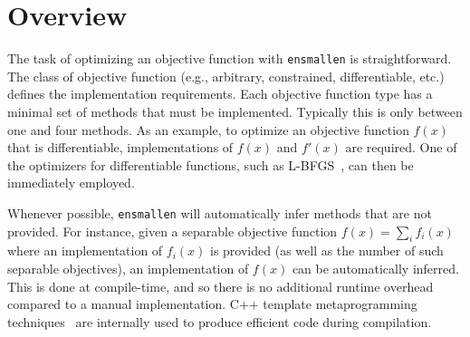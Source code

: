 \section{Overview}
\label{sec:overview}



% 

The task of optimizing an objective function with {\tt ensmallen} is
straightforward.  The class of objective function (e.g., arbitrary, constrained,
differentiable, etc.) defines the implementation requirements.
Each objective function type has a minimal set of methods that must be implemented.
Typically this is only between one and four methods.
As an example,
to optimize an objective function $f(x)$ that is differentiable,
implementations of $f(x)$ and $f'(x)$ are required.
One of the optimizers for differentiable functions,
such as L-BFGS~\cite{liu1989limited},
can then be immediately employed.

Whenever possible, {\tt ensmallen} will automatically infer methods that are
not provided.  For instance, given a separable objective function $f(x) = \sum_i
f_i(x)$ where an implementation of $f_i(x)$ is provided (as well as the number
of such separable objectives), an implementation of $f(x)$ can be automatically
inferred.  This is done at compile-time, and so there is no additional runtime
overhead compared to a manual implementation.  C++ template metaprogramming
techniques~\cite{abrahams2004c++,alexandrescu2001modern, veldhuizen1998c++} are
internally used to produce efficient code during compilation.

